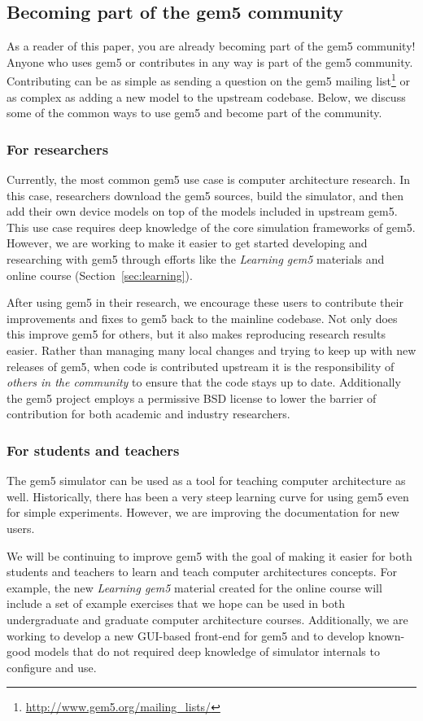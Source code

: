 \subsection{Becoming part of the gem5 community}

As a reader of this paper, you are already becoming part of the gem5 community!
Anyone who uses gem5 or contributes in any way is part of the gem5 community.
Contributing can be as simple as sending a question on the gem5 mailing list\footnote{\url{http://www.gem5.org/mailing_lists/}} or as complex as adding a new model to the upstream codebase.
Below, we discuss some of the common ways to use gem5 and become part of the community.

\subsubsection{For researchers}

Currently, the most common gem5 use case is computer architecture research.
In this case, researchers download the gem5 sources, build the simulator, and then add their own device models on top of the models included in upstream gem5.
This use case requires deep knowledge of the core simulation frameworks of gem5.
However, we are working to make it easier to get started developing and researching with gem5 through efforts like the \emph{Learning gem5} materials and online course (Section~\ref{sec:learning}).

After using gem5 in their research, we encourage these users to contribute their improvements and fixes to gem5 back to the mainline codebase.
Not only does this improve gem5 for others, but it also makes reproducing research results easier.
Rather than managing many local changes and trying to keep up with new releases of gem5, when code is contributed upstream it is the responsibility of \emph{others in the community} to ensure that the code stays up to date.
Additionally the gem5 project employs a permissive BSD license to lower the barrier of contribution for both academic and industry researchers.

\subsubsection{For students and teachers}

The gem5 simulator can be used as a tool for teaching computer architecture as well.
Historically, there has been a very steep learning curve for using gem5 even for simple experiments.
However, we are improving the documentation for new users.

We will be continuing to improve gem5 with the goal of making it easier for both students and teachers to learn and teach computer architectures concepts.
For example, the new \emph{Learning gem5} material created for the online course will include a set of example exercises that we hope can be used in both undergraduate and graduate computer architecture courses.
Additionally, we are working to develop a new GUI-based front-end for gem5 and to develop known-good models that do not required deep knowledge of simulator internals to configure and use.
